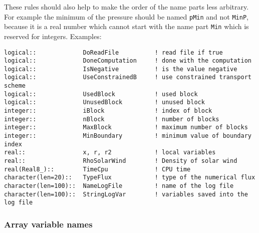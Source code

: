 \documentclass{article}
\begin{document}
These rules should also help to make the order of the name parts
less arbitrary. For example the minimum of the pressure should
be named {\tt pMin} and not {\tt MinP}, because it is a real
number which cannot start with the name part {\tt Min} which 
is reserved for integers.
Examples:
\begin{verbatim}
logical::             DoReadFile          ! read file if true
logical::             DoneComputation     ! done with the computation
logical::             IsNegative          ! is the value negative
logical::             UseConstrainedB     ! use constrained transport scheme
logical::             UsedBlock           ! used block
logical::             UnusedBlock         ! unused block
integer::             iBlock              ! index of block
integer::             nBlock              ! number of blocks
integer::             MaxBlock            ! maximum number of blocks
integer::             MinBoundary         ! minimum value of boundary index
real::                x, r, r2            ! local variables
real::                RhoSolarWind        ! Density of solar wind
real(Real8_)::        TimeCpu             ! CPU time 
character(len=20)::   TypeFlux            ! type of the numerical flux
character(len=100)::  NameLogFile         ! name of the log file
character(len=100)::  StringLogVar        ! variables saved into the log file
\end{verbatim}

\subsubsection{Array variable names}
\end{document}
